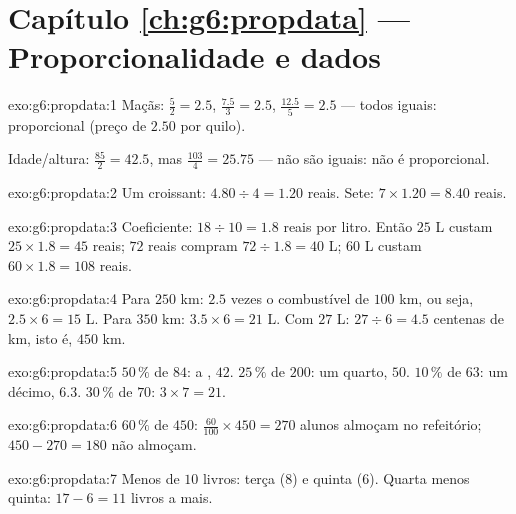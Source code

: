 \section*{Capítulo \ref{ch:g6:propdata} --- Proporcionalidade e dados}

\begin{solution}{exo:g6:propdata:1}
Maçãs:  $\frac52 = 2.5$, $\frac{7.5}{3} = 2.5$,
$\frac{12.5}{5} = 2.5$ --- todos iguais: proporcional (preço de
$2.50$ por quilo).

Idade/altura: $\frac{85}{2} = 42.5$, mas $\frac{103}{4} = 25.75$ ---
não são iguais: não é proporcional.
\end{solution}

\begin{solution}{exo:g6:propdata:2}
Um croissant: $4.80 \div 4 = 1.20$ reais. Sete:
$7 \times 1.20 = 8.40$ reais.
\end{solution}

\begin{solution}{exo:g6:propdata:3}
Coeficiente: $18 \div 10 = 1.8$ reais por litro. Então $25$ L custam
$25 \times 1.8 = 45$ reais; $72$ reais compram $72 \div 1.8 = 40$ L;
$60$ L custam $60 \times 1.8 = 108$ reais.
\end{solution}

\begin{solution}{exo:g6:propdata:4}
Para $250$ km: $2.5$ vezes o combustível de $100$ km, ou seja,
$2.5 \times 6 = 15$ L. Para $350$ km: $3.5 \times 6 = 21$ L. Com
$27$ L: $27 \div 6 = 4.5$ centenas de km, isto é, $450$ km.
\end{solution}

\begin{solution}{exo:g6:propdata:5}
$50\,\%$ de $84$: a , $42$. \quad
$25\,\%$ de $200$: um quarto, $50$. \quad
$10\,\%$ de $63$: um décimo, $6.3$. \quad
$30\,\%$ de $70$: $3 \times 7 = 21$.
\end{solution}

\begin{solution}{exo:g6:propdata:6}
$60\,\%$ de $450$: $\frac{60}{100} \times 450 = 270$ alunos almoçam no
refeitório; $450 - 270 = 180$ não almoçam.
\end{solution}

\begin{solution}{exo:g6:propdata:7}
Menos de $10$ livros: terça ($8$) e quinta ($6$). Quarta menos quinta:
$17 - 6 = 11$ livros a mais.
\end{solution}

